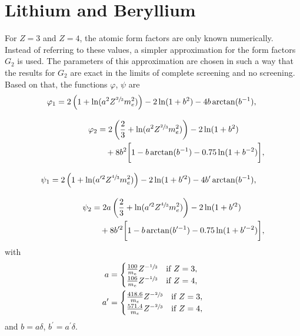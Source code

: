 \section{Lithium and Beryllium}

For $Z=3$ and $Z=4$, the atomic form factors are only known numerically.
Instead of referring to these values, a simpler approximation for the form factors $G_2$ is used.
The parameters of this approximation are chosen in such a way that the results for $G_2$ are exact in the limits of complete screening and no screening.
Based on that, the functions $\varphi$, $\psi$ are \cite{RevModPhys.46.815}
%
\begingroup
\allowdisplaybreaks
\begin{align}
	\label{eqn:phi_1}
	\begin{split}
		\varphi_1 &= 2\left(1 + \ln(a^2 Z^{\sfrac{2}{3}} m_e^2)\right) - 2 \ln(1 + b^2) - 4 b \arctan(b^{-1}),
	\end{split}
	\\[2ex]
	\begin{split}
		\varphi_2 &= 2 \left(\frac{2}{3} + \ln(a^2 Z^{\sfrac{2}{3}} m_e^2 )\right) - 2 \ln(1 + b^2) \\&\quad+ 8 b^2  \biggl[ 1 - b \arctan(b^{-1}) - 0.75 \ln(1 + b^{-2}) \biggr],
	\end{split}
	\\[2ex]
	\begin{split}
		\psi_1 &= 2\left(1 + \ln(a^{\prime2} Z^{\sfrac{4}{3}} m_e^2)\right) - 2 \ln(1 + b^{\prime2}) - 4 b^{\prime} \arctan(b^{-1}),
	\end{split}
	\\[2ex]
	\label{eqn:psi_2}
	\begin{split}
		\psi_2 &= 2a \left(\frac{2}{3} + \ln(a^{\prime2} Z^{\sfrac{4}{3}} m_e^2 )\right) - 2 \ln(1 + b^{\prime2}) \\&\quad+ 8 b^{\prime2}  \biggl[ 1 - b \arctan(b^{\prime-1}) - 0.75 \ln(1 + b^{\prime-2}) \biggr],
	\end{split}
\end{align}
\endgroup
%
with
%
\begin{align*}
	a &= 
	\begin{cases}
		\frac{100}{m_e} Z^{-\sfrac{1}{3}} & \text{if $Z = 3$},\\
		\frac{106}{m_e} Z^{-\sfrac{1}{3}} & \text{if $Z = 4$},\\
	\end{cases}\\
	a^{\prime} &= 
	\begin{cases}
		\frac{418.6}{m_e} Z^{-\sfrac{2}{3}} & \text{if $Z = 3$},\\
		\frac{571.4}{m_e} Z^{-\sfrac{2}{3}} & \text{if $Z = 4$},\\
	\end{cases}
\end{align*}
and $b = a \delta$, $b^{\prime} = a^{\prime} \delta$.
%

